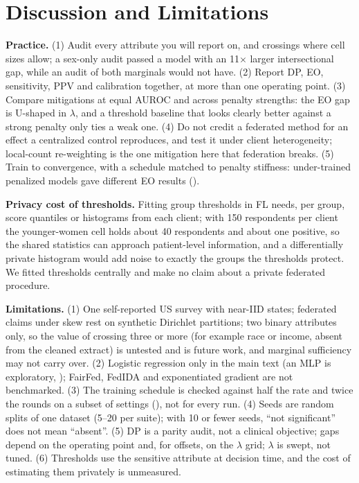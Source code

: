 \section{Discussion and Limitations}
\textbf{Practice.} (1) Audit every attribute you will report on, and crossings where cell sizes allow; a sex-only audit passed a model with an 11$\times$ larger intersectional gap, while an audit of both marginals would not have. (2) Report DP, EO, sensitivity, PPV and calibration together, at more than one operating point. (3) Compare mitigations at equal AUROC and across penalty strengths: the EO gap is U-shaped in $\lambda$, and a threshold baseline that looks clearly better against a strong penalty only ties a weak one. (4) Do not credit a federated method for an effect a centralized control reproduces, and test it under client heterogeneity; local-count re-weighting is the one mitigation here that federation breaks. (5) Train to convergence, with a schedule matched to penalty stiffness: under-trained penalized models gave different EO results ().

\textbf{Privacy cost of thresholds.} Fitting group thresholds in FL needs, per group, score quantiles or histograms from each client; with 150 respondents per client the younger-women cell holds about 40 respondents and about one positive, so the shared statistics can approach patient-level information, and a differentially private histogram would add noise to exactly the groups the thresholds protect. We fitted thresholds centrally and make no claim about a private federated procedure.

\textbf{Limitations.} (1) One self-reported US survey with near-IID states; federated claims under skew rest on synthetic Dirichlet partitions; two binary attributes only, so the value of crossing three or more (for example race or income, absent from the cleaned extract) is untested and is future work, and marginal sufficiency may not carry over. (2) Logistic regression only in the main text (an MLP is exploratory, ); FairFed, FedIDA and exponentiated gradient are not benchmarked. (3) The training schedule is checked against half the rate and twice the rounds on a subset of settings (), not for every run. (4) Seeds are random splits of one dataset (5--20 per suite); with 10 or fewer seeds, ``not significant'' does not mean ``absent''. (5) DP is a parity audit, not a clinical objective; gaps depend on the operating point and, for offsets, on the $\lambda$ grid; $\lambda$ is swept, not tuned. (6) Thresholds use the sensitive attribute at decision time, and the cost of estimating them privately is unmeasured.

